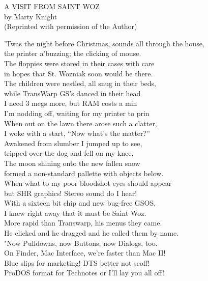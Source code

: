 \documentclass{report}
\newenvironment{usenet}{\raggedright\small\ttfamily}{\rmfamily}
\begin{document}
    \begin{usenet}
        A VISIT FROM SAINT WOZ\\
        by Marty Knight\\
        (Reprinted with permission of the Author)

        'Twas the night before Christmas, sounds all through the house,\\
        the printer a'buzzing; the clicking of mouse.\\
        The floppies were stored in their cases with care\\
        in hopes that St. Wozniak soon would be there.\\
        The children were nestled, all snug in their beds,\\
        while TransWarp GS's danced in their head\\
        I need 3 megs more, but RAM costs a min\\
        I'm nodding off, waiting for my printer to prin\\
        When out on the lawn there arose such a clatter,\\
        I woke with a start, ``Now what's the matter?''\\
        Awakened from slumber I jumped up to see,\\
        tripped over the dog and fell on my knee.\\
        The moon shining onto the new fallen snow\\
        formed a non-standard pallette with objects below.\\
        When what to my poor bloodshot eyes should appear\\
        but SHR graphics! Stereo sound do I hear!\\
        With a sixteen bit chip and new bug-free GSOS,\\
        I knew right away that it must be Saint Woz.\\
        More rapid than Transwarp, his menus they came.\\
        He clicked and he dragged and he called them by name.\\
        "Now Pulldowns, now Buttons, now Dialogs, too.\\
        On Finder, Mac Interface, we're faster than Mac II!\\
        Blue slips for marketing! DTS better not scoff!\\
        ProDOS format for Technotes or I'll lay you all off!\\

\end{usenet}
\end{document}
